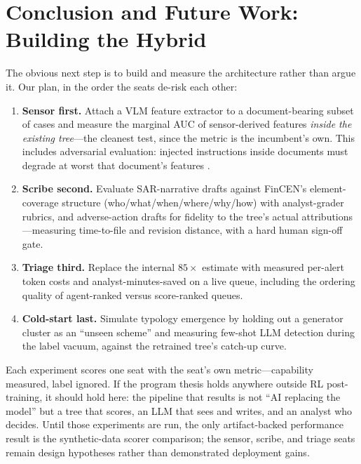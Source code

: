 \section{Conclusion and Future Work: Building the Hybrid}
\label{sec:p8-future}

The obvious next step is to build and measure the architecture rather than
argue it. Our plan, in the order the seats de-risk each other:

\begin{enumerate}[leftmargin=1.5em, itemsep=1pt, topsep=2pt]
\item \textbf{Sensor first.} Attach a VLM feature extractor to a
document-bearing subset of cases and measure the marginal AUC of
sensor-derived features \emph{inside the existing tree}---the cleanest test,
since the metric is the incumbent's own. This includes adversarial
evaluation: injected instructions inside documents must degrade at worst that
document's features \citep{greshake2023injection}.
\item \textbf{Scribe second.} Evaluate SAR-narrative drafts against FinCEN's
element-coverage structure (who/what/when/where/why/how)
\citep{fincen2003sarnarrative} with analyst-grader rubrics, and
adverse-action drafts for fidelity to the tree's actual attributions
\citep{cfr1002_9, cfpb2022circular}---measuring time-to-file and revision
distance, with a hard human sign-off gate.
\item \textbf{Triage third.} Replace the internal $85\times$ estimate with
measured per-alert token costs and analyst-minutes-saved on a live queue,
including the ordering quality of agent-ranked versus score-ranked queues.
\item \textbf{Cold-start last.} Simulate typology emergence by holding out a
generator cluster as an ``unseen scheme'' and measuring few-shot LLM detection
during the label vacuum, against the retrained tree's catch-up curve.
\end{enumerate}

Each experiment scores one seat with the seat's own metric---capability
measured, label ignored. If the program thesis holds anywhere outside RL
post-training, it should hold here: the pipeline that results is not ``AI
replacing the model'' but a tree that scores, an LLM that sees and writes, and
an analyst who decides. Until those experiments are run, the only artifact-backed
performance result is the synthetic-data scorer comparison; the sensor, scribe,
and triage seats remain design hypotheses rather than demonstrated deployment
gains.

